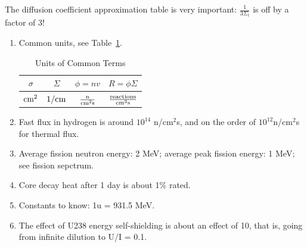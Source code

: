 \documentclass{school-22.211-notes}
\begin{document}
The diffusion coefficient approximation table is very important: $\frac{1}{3\Sigma_t}$ is off by a factor of 3! 





\clearpage
\begin{enumerate}
\item Common units, see Table~\ref{units}.
\begin{table}
  \centering
  \begin{tabular}{|c|c|c|c|} \hline
   $\sigma$ & $\Sigma$ & $\phi = nv$ & $R = \phi \Sigma$  \\ \hline
   $\mathrm{cm}^2$ & $1/\mathrm{cm}$ & $\frac{n}{\mathrm{cm}^2 \mathrm{s}}$ & $\frac{\mathrm{reactions}}{\mathrm{cm}^3 \mathrm{s}}$ \\ \hline
  \end{tabular}
  \caption{Units of Common Terms} \label{units}
\end{table}
\item Fast flux in hydrogen is around $10^{14}$ n/cm$^2$s, and on the order of $10^{12}$n/cm$^2$s for thermal flux. 
\item Average fission neutron energy: 2 MeV; average peak fission energy: 1 MeV; see fission sepctrum. 
\item Core decay heat after 1 day is about 1\% rated. 
\item Constants to know: 1u = 931.5 MeV. 
\item The effect of U238 energy self-shielding is about an effect of 10, that is, going from infinite dilution to U/I = 0.1. 
\end{enumerate}
\end{document}
